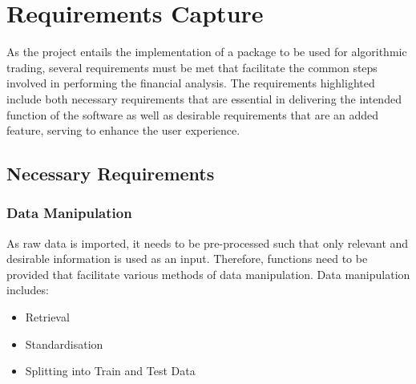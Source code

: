 \chapter{Requirements Capture}
\label{chapter: Requirements}



 As the project entails the implementation of a package to be used for  algorithmic trading, several requirements must be met that facilitate the common steps involved in performing the financial analysis. The requirements highlighted include both necessary requirements that are essential in delivering the intended function of the software as well as desirable requirements that are an added feature, serving to enhance the user experience.

\section{Necessary Requirements}

\subsection{Data Manipulation}
As raw data is imported, it needs to be pre-processed such that only relevant and desirable information is used as an input. Therefore, functions need to be provided that facilitate various methods of data manipulation. Data manipulation includes:

\begin{itemize}
    \item Retrieval
    \item Standardisation
    \item Splitting into Train and Test Data
\end{itemize}

